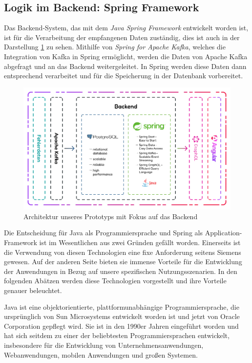 \subsection{Logik im Backend: Spring Framework}

Das Backend-System, das mit dem \emph{Java Spring Framework} entwickelt worden ist, ist für die Verarbeitung der empfangenen Daten zuständig, dies ist auch in der Darstellung \ref{fig:BackendArchitektur} zu sehen.  Mithilfe von \emph{Spring for Apache Kafka}, welches die Integration von Kafka in Spring ermöglicht, werden die Daten von Apache Kafka abgefragt und an das Backend weitergeleitet. In Spring werden diese Daten dann entsprechend verarbeitet und für die Speicherung in der Datenbank vorbereitet.

\begin{figure}
    \centering
    \includegraphics[width=1\textwidth]{content/img/Architecture/Architecture_Backend.jpg}
    \caption{Architektur unseres Prototyps mit Fokus auf das Backend}
    \label{fig:BackendArchitektur}
\end{figure}
\FloatBarrier

Die Entscheidung für Java als Programmiersprache und Spring als Application-Framework ist im Wesentlichen aus zwei Gründen gefällt worden. Einerseits ist die Verwendung von diesen Technologien eine fixe Anforderung seitens Siemens gewesen. Auf der anderen Seite bieten sie immense Vorteile für die Entwicklung der Anwendungen in Bezug auf unsere spezifischen Nutzungsszenarien. In den folgenden Abätzen werden diese Technologien vorgestellt und ihre Vorteile genauer beleuchtet.

Java ist eine objektorientierte, plattformunabhängige Programmiersprache, die ursprünglich von Sun Microsystems entwickelt worden ist und jetzt von Oracle Corporation gepflegt wird. Sie ist in den 1990er Jahren eingeführt worden und hat sich seitdem zu einer der beliebtesten Programmiersprachen entwickelt, insbesondere für die Entwicklung von Unternehmensanwendungen, Webanwendungen, mobilen Anwendungen und großen Systemen. \cite{javaDocs}

